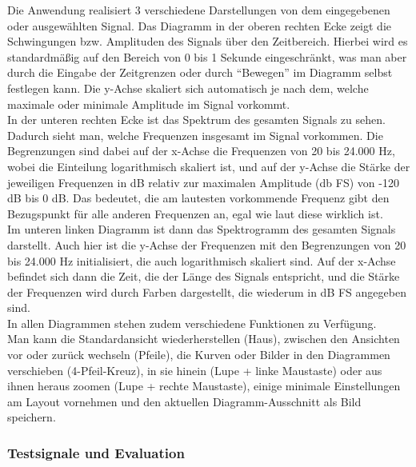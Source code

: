 \documentclass[a4paper]{article}
\begin{document}
Die Anwendung realisiert 3 verschiedene Darstellungen von dem eingegebenen oder ausgewählten Signal. Das Diagramm in der oberen rechten Ecke zeigt die Schwingungen bzw. Amplituden des Signals über den Zeitbereich. Hierbei wird es standardmäßig auf den Bereich von 0 bis 1 Sekunde eingeschränkt, was man aber durch die Eingabe der Zeitgrenzen oder durch "`Bewegen"' im Diagramm selbst festlegen kann. Die y-Achse skaliert sich automatisch je nach dem, welche maximale oder minimale Amplitude im Signal vorkommt.\\
In der unteren rechten Ecke ist das Spektrum des gesamten Signals zu sehen. Dadurch sieht man, welche Frequenzen insgesamt im Signal vorkommen. Die Begrenzungen sind dabei auf der x-Achse die Frequenzen von 20 bis 24.000 Hz, wobei die Einteilung logarithmisch skaliert ist, und auf der y-Achse die Stärke der jeweiligen Frequenzen in dB relativ zur maximalen Amplitude (db FS) von -120 dB bis 0 dB. Das bedeutet, die am lautesten vorkommende Frequenz gibt den Bezugspunkt für alle anderen Frequenzen an, egal wie laut diese wirklich ist.\\
Im unteren linken Diagramm ist dann das Spektrogramm des gesamten Signals darstellt. Auch hier ist die y-Achse der Frequenzen mit den Begrenzungen von 20 bis 24.000 Hz initialisiert, die auch logarithmisch skaliert sind. Auf der x-Achse befindet sich dann die Zeit, die der Länge des Signals entspricht, und die Stärke der Frequenzen wird durch Farben dargestellt, die wiederum in dB FS angegeben sind.\vspace{1em}\\
In allen Diagrammen stehen zudem verschiedene Funktionen zu Verfügung.\\
Man kann die Standardansicht wiederherstellen (Haus), zwischen den Ansichten vor oder zurück wechseln (Pfeile), die Kurven oder Bilder in den Diagrammen verschieben (4-Pfeil-Kreuz), in sie hinein (Lupe + linke Maustaste) oder aus ihnen heraus zoomen (Lupe + rechte Maustaste), einige minimale Einstellungen am Layout vornehmen und den aktuellen Diagramm-Ausschnitt als Bild speichern.

\subsubsection{Testsignale und Evaluation}
\end{document}
